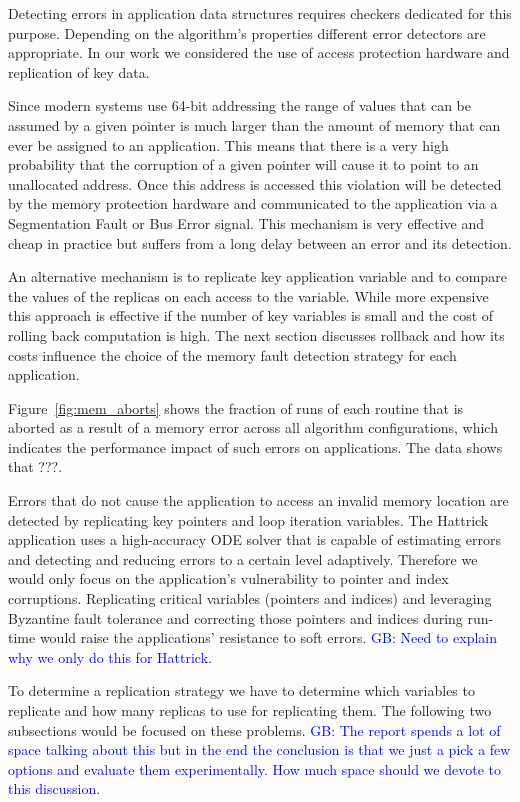 \documentclass{sig-alternate}
\newcommand{\greg}[1]{%
  \textcolor{blue}{GB: #1}
}
\begin{document}
Detecting errors in application data structures requires checkers dedicated for this purpose.
Depending on the algorithm's properties different error detectors are appropriate.
In our work we considered the use of access protection hardware and replication of key data.

Since modern systems use 64-bit addressing the range of values that can be assumed by a given pointer is much larger than the amount of memory that can ever be assigned to an application.
This means that there is a very high probability that the corruption of a given pointer will cause it to point to an unallocated address.
Once this address is accessed this violation will be detected by the memory protection hardware and communicated to the application via a Segmentation Fault or Bus Error signal.
This mechanism is very effective and cheap in practice but suffers from a long delay between an error and its detection.

An alternative mechanism is to replicate key application variable and to compare the values of the replicas on each access to the variable.
While more expensive this approach is effective if the number of key variables is small and the cost of rolling back computation is high.
The next section discusses rollback and how its costs influence the choice of the memory fault detection strategy for each application.

Figure~\ref{fig:mem_aborts} shows the fraction of runs of each routine that is aborted as a result of a memory error across all algorithm configurations, which indicates the performance impact of such errors on applications.
The data shows that  ???.

Errors that do not cause the application to access an invalid memory location are detected by replicating key pointers and loop iteration variables.
The Hattrick application uses a high-accuracy ODE solver that is capable of estimating errors and detecting and reducing errors to a certain level adaptively.
Therefore we would only focus on the application's vulnerability to pointer and index corruptions.
Replicating critical variables (pointers and indices) and leveraging Byzantine fault tolerance and correcting those pointers and indices during run-time would raise the applications' resistance to soft errors.
\greg{Need to explain why we only do this for Hattrick.}

To determine a replication strategy we have to determine which variables to replicate and how many replicas to use for replicating them. The following two subsections would be focused on these problems.
\greg{The report spends a lot of space talking about this but in the end the conclusion is that we just a pick a few options and evaluate them experimentally. How much space should we devote to this discussion.}
\end{document}
